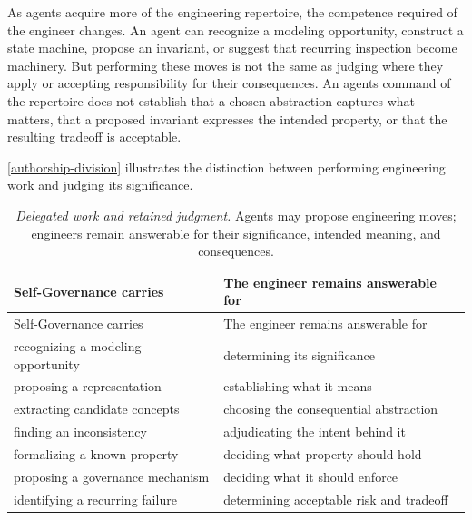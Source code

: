 As agents acquire more of the engineering repertoire, the competence required of the engineer changes. An agent can recognize a modeling opportunity, construct a state machine, propose an invariant, or suggest that recurring inspection become machinery. But performing these moves is not the same as judging where they apply or accepting responsibility for their consequences. An agent\textquotesingle s command of the repertoire does not establish that a chosen abstraction captures what matters, that a proposed invariant expresses the intended property, or that the resulting tradeoff is acceptable.

\autoref{authorship-division} illustrates the distinction between performing engineering work and judging its significance.

{\footnotesize
\begin{longtable}[]{@{}
  >{\raggedright\arraybackslash}p{}
  >{\raggedright\arraybackslash}p{}@{}}
\caption[Delegated work and retained judgment]{\emph{Delegated work and retained judgment.} Agents may propose engineering moves; engineers remain answerable for their significance, intended meaning, and consequences.}\label{authorship-division}\tabularnewline
\toprule\noalign{}
\begin{minipage}[b]{\linewidth}\raggedright
Self-Governance carries
\end{minipage} & \begin{minipage}[b]{\linewidth}\raggedright
The engineer remains answerable for
\end{minipage} \\
\midrule\noalign{}
\endfirsthead
\toprule\noalign{}
\begin{minipage}[b]{\linewidth}\raggedright
Self-Governance carries
\end{minipage} & \begin{minipage}[b]{\linewidth}\raggedright
The engineer remains answerable for
\end{minipage} \\
\midrule\noalign{}
\endhead
\bottomrule\noalign{}
\endlastfoot
recognizing a modeling opportunity & determining its significance \\
proposing a representation & establishing what it means \\
extracting candidate concepts & choosing the consequential abstraction \\
finding an inconsistency & adjudicating the intent behind it \\
formalizing a known property & deciding what property should hold \\
proposing a governance mechanism & deciding what it should enforce \\
identifying a recurring failure & determining acceptable risk and tradeoff \\
\end{longtable}
}

